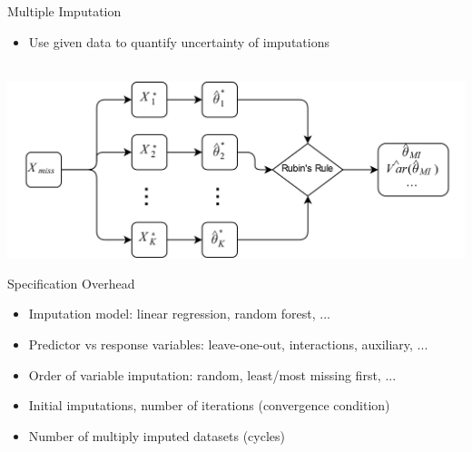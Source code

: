 \documentclass[aspectratio=43]{beamer}
\begin{document}
\begin{frame}{Multiple Imputation}
\begin{itemize}
\item Use given data to quantify uncertainty of imputations
\end{itemize}
\phantom{This text will be invisible} \\
\centering
\includegraphics[width=0.9\paperwidth]{MI}
\end{frame}

\begin{frame}{Specification Overhead}
\begin{itemize}
\item Imputation model: linear regression, random forest, ...
\item Predictor vs response variables: leave-one-out, interactions, auxiliary, ...
\item Order of variable imputation: random, least/most missing first, ...
\item Initial imputations, number of iterations (convergence condition)
\item Number of multiply imputed datasets (cycles)
\end{itemize}
\end{frame}
\end{document}
